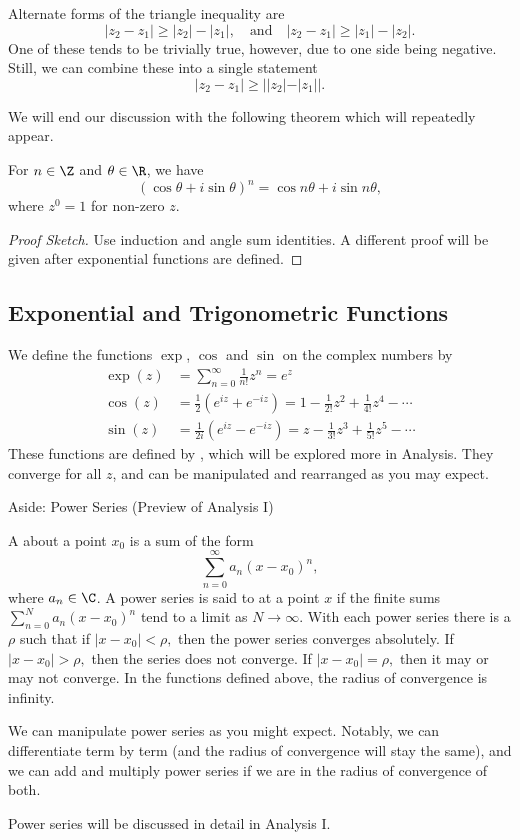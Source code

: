 Alternate forms of the triangle inequality are
$$
|z_2 - z_1| \geq |z_2| - |z_1|, \quad \text{and} \quad |z_2  - z_1| \geq |z_1| - |z_2|.
$$
One of these tends to be trivially true, however, due to one side being negative. Still, we can combine these into a single statement
$$
|z_2 - z_1| \geq ||z_2| - |z_1||.
$$

We will end our discussion with the following theorem which will repeatedly appear.

\begin{theorem}
	For $n \in \Z$ and $\theta \in \R$, we have
	$$
	(\cos \theta + i \sin \theta)^n = \cos n \theta + i \sin n \theta,
	$$
	where $z^0 = 1$ for non-zero $z$.
\end{theorem}
\begin{proof}[Proof Sketch]
	Use induction and angle sum identities. A different proof will be given after exponential functions are defined.
\end{proof}

\subsection{Exponential and Trigonometric Functions}

We define the functions $\exp$, $\cos$ and $\sin$ on the complex numbers by
\begin{align*}
	\exp(z) &= \sum_{n = 0}^{\infty} \frac{1}{n!} z^n = e^z \\
	\cos(z) &= \frac{1}{2}(e^{iz} + e^{-iz}) = 1 - \frac{1}{2!}z^2 + \frac{1}{4!} z^4 - \cdots \\
	\sin(z) &= \frac{1}{2i}(e^{iz} - e^{-iz}) = z - \frac{1}{3!}z^3 + \frac{1}{5!}z^5 - \cdots
\end{align*}
These functions are defined by , which will be explored more in Analysis. They converge for all $z$, and can be manipulated and rearranged as you may expect.

\begin{aside}{Aside: Power Series (Preview of Analysis I)}

	A  about a point $x_0$ is a sum of the form
	$$
	\sum_{n = 0}^{\infty} a_n(x - x_0)^n,	
	$$
	where $a_n \in \C$. A power series is said to  at a point $x$ if the finite sums
	$
	\sum_{n = 0}^N a_n(x - x_0)^n
	$
	tend to a limit as $N \rightarrow \infty$. With each power series there is a  $\rho$ such that if $\left|x-x_{0}\right|<\rho,$ then the power series converges absolutely. If $\left|x-x_{0}\right|>\rho,$ then the series does not converge. If $\left|x-x_{0}\right|=\rho,$ then it may or may not converge. In the functions defined above, the radius of convergence is infinity.


	We can manipulate power series as you might expect. Notably, we can differentiate term by term (and the radius of convergence will stay the same), and we can add and multiply power series if we are in the radius of convergence of both.

	Power series will be discussed in detail in Analysis I.
	
\end{aside}

